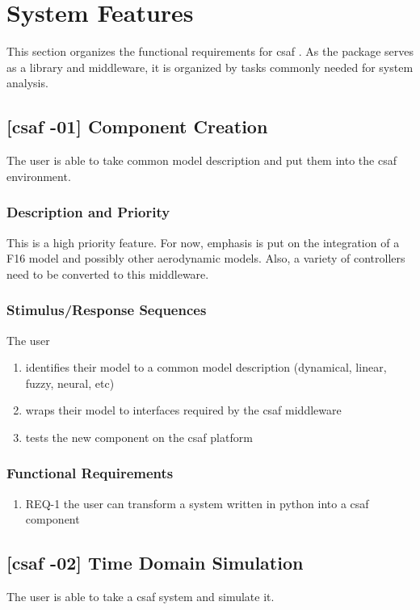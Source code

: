 \chapter{System Features}
This section organizes the functional requirements for \acrshort{csaf} . As the package serves as a library and 
middleware, it is organized by tasks commonly needed for system analysis.

\section{[\acrshort{csaf} -01] Component Creation}
The user is able to take common model description and put them into the \acrshort{csaf}  environment.

\subsection{Description and Priority}
This is a high priority feature. For now, emphasis is put on the integration of a F16 model and possibly other 
aerodynamic models. Also, a variety of controllers need to be converted to this middleware.

\subsection{Stimulus/Response Sequences}
The user
\begin{enumerate}
\item identifies their model to a common model description (dynamical, linear, fuzzy, neural, etc)
\item wraps their model to interfaces required by the \acrshort{csaf}  middleware
\item tests the new component on the \acrshort{csaf}  platform
\end{enumerate}

\subsection{Functional Requirements}
\begin{enumerate}
\item REQ-1 \quad the user can transform a system written in python into a \acrshort{csaf}  component
\end{enumerate}

\section{[\acrshort{csaf} -02] Time Domain Simulation}
The user is able to take a \acrshort{csaf}  system and simulate it.

